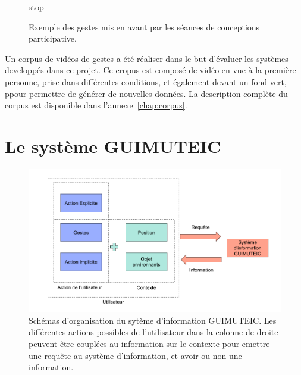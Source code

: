 \begin{figure}
\begin{minipage}[c]{.32\linewidth}
		\caption*{stop}%
	\end{minipage}
	\caption{Exemple des gestes mis en avant par les séances de conceptions participative.}
	
\end{figure}

Un corpus de vidéos de gestes a été réaliser dans le but d'évaluer les systèmes developpés dans ce projet. Ce cropus est composé de vidéo en vue à la première personne, prise dans différentes conditions, et également devant un fond vert, ppour permettre de générer de nouvelles données. La description complète du corpus est disponible dans l'annexe~\ref{chap:corpus}.

\section{Le système GUIMUTEIC}


\begin{figure}%
\includegraphics[width=\columnwidth]{figures/ActionContexte.png}%
\caption{Schémas d'organisation du sytème d'information GUIMUTEIC. Les différentes actions possibles de l'utilisateur dans la colonne de droite peuvent être couplées au information sur le contexte pour emettre une requête au système d'information, et avoir ou non une information.}%
\label{fig:actioncontexte}%
\end{figure}






	
	
